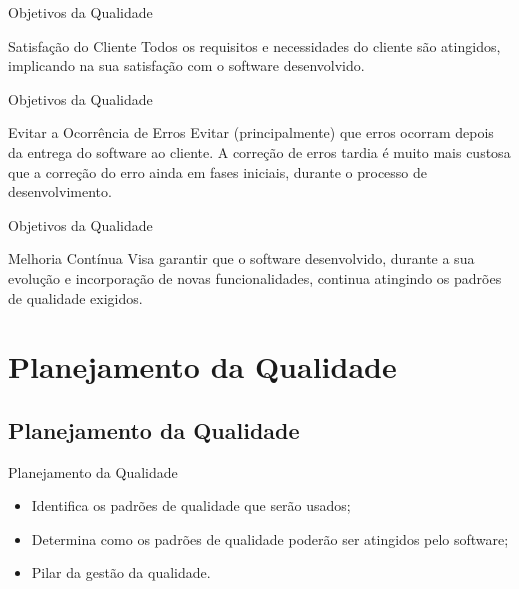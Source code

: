 \documentclass[xcolor=x11names,compress]{beamer}
\begin{document}
\begin{frame}{Objetivos da Qualidade}

\begin{alertblock}{Satisfação do Cliente}
Todos os requisitos e necessidades do cliente são atingidos, implicando na sua satisfação com o software desenvolvido.
\end{alertblock}

\end{frame}

\begin{frame}{Objetivos da Qualidade}

\begin{alertblock}{Evitar a Ocorrência de Erros}
Evitar (principalmente) que erros ocorram depois da entrega do software ao cliente. A correção de erros tardia é muito mais custosa que a correção do erro ainda em fases iniciais, durante o processo de desenvolvimento.
\end{alertblock}

\end{frame}

\begin{frame}{Objetivos da Qualidade}

\begin{alertblock}{Melhoria Contínua}
Visa garantir que o software desenvolvido, durante a sua evolução e incorporação de novas funcionalidades, continua atingindo os padrões de qualidade exigidos.
\end{alertblock}

\end{frame}

\section{Planejamento da Qualidade}
\subsection{Planejamento da Qualidade}

\begin{frame}{Planejamento da Qualidade}

\begin{itemize}
\itemsep 5mm

\item Identifica os padrões de qualidade que serão usados;

\item Determina como os padrões de qualidade poderão ser atingidos pelo software;

\item Pilar da gestão da qualidade.

\end{itemize}

\end{frame}
\end{document}
